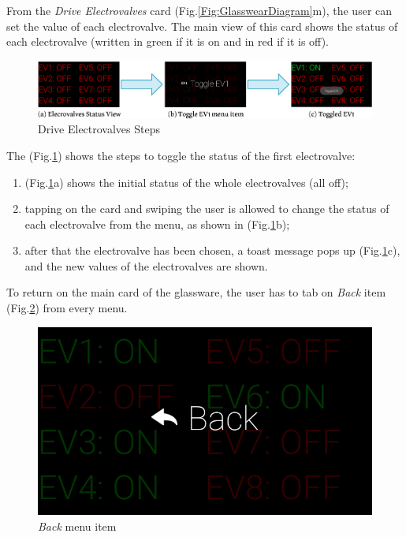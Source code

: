 \documentclass[12pt,a4paper,twoside]{article}
\begin{document}
	
	From the \textit{Drive Electrovalves} card (Fig.\ref{Fig:GlasswearDiagram}m), the user can set the value of each electrovalve. The main view of this card shows the status of each electrovalve (written in green if it is on and in red if it is off).
	\clearpage
	\begin{figure}[h]
		\centering
		\includegraphics[width=\textwidth]{Intro/electrovalves.eps}
		\caption{Drive Electrovalves Steps}
		\label{Fig:Electrovalves}
	\end{figure}
	
	The (Fig.\ref{Fig:Electrovalves}) shows the steps to toggle the status of the first electrovalve:
	\begin{enumerate}
		\item (Fig.\ref{Fig:Electrovalves}a) shows the initial status of the whole electrovalves (all off);
		\item tapping on the card and swiping the user is allowed to change the status of each electrovalve from the menu, as shown in (Fig.\ref{Fig:Electrovalves}b);
		\item after that the electrovalve has been chosen, a toast message pops up (Fig.\ref{Fig:Electrovalves}c), and the new values of the electrovalves are shown. 
	\end{enumerate}
	
	To return on the main card of the glassware, the user has to tab on \textit{Back} item (Fig.\ref{Fig:Back}) from every menu.
	
	\begin{figure}[h]
		\centering
		\includegraphics[scale=.28]{Intro/back_menu}
		\caption{\textit{Back} menu item}
		\label{Fig:Back}
	\end{figure}
	
\end{document}
